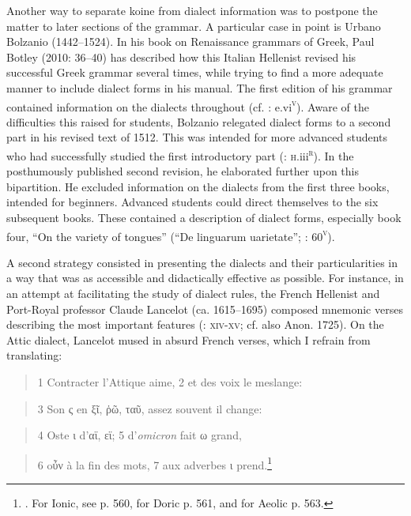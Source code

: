 Another way to separate koine from dialect information was to postpone the matter to later sections of the grammar. A particular case in point is Urbano Bolzanio (1442–1524). In his book on Renaissance grammars of Greek, Paul Botley (2010: 36–40) has described how this Italian Hellenist revised his successful Greek grammar several times, while trying to find a more adequate manner to include dialect forms in his manual. The first edition of his grammar contained information on the dialects throughout (cf. \citealt{Bolzanio1497}: e.vi\textsc{\textsuperscript{v}}). Aware of the difficulties this raised for students, Bolzanio relegated dialect forms to a second part in his revised text of 1512. This was intended for more advanced students who had successfully studied the first introductory part (\citealt{Bolzanio1512}: \textsc{h}.iii\textsc{\textsuperscript{r}}). In the posthumously published second revision, he elaborated further upon this bipartition. He excluded information on the dialects from the first three books, intended for beginners. Advanced students could direct themselves to the six subsequent books. These contained a description of dialect forms, especially book four, “On the variety of tongues” (“De linguarum uarietate”; \citealt{Bolzanio1545}: 60\textsc{\textsuperscript{v}}).

A second strategy consisted in presenting the dialects and their particularities in a way that was as accessible and didactically effective as possible. For instance, in an attempt at facilitating the study of dialect rules, the French Hellenist and Port-Royal professor Claude Lancelot (ca. 1615–1695) composed mnemonic verses describing the most important features (\citealt{Lancelot1655}: \textsc{xiv-xv;} cf. also Anon. 1725). On the Attic dialect, Lancelot mused in absurd French verses, which I refrain from translating:

\begin{quote}
1 Contracter l’Attique aime, 2 et des voix le meslange:
\end{quote}

\begin{quote}
3 Son ς en ξῖ, ῥῶ, ταῦ, assez souvent il change:
\end{quote}

\begin{quote}
4 Oste ι d’αϊ, εϊ; 5 d’\textit{omicron} fait ω grand,
\end{quote}

\begin{quote}
6 oὖν à la fin des mots, 7 aux adverbes ι prend.\footnote{\citet[558]{Lancelot1655}. For Ionic, see p. 560, for Doric p. 561, and for Aeolic p. 563.}
\end{quote}

